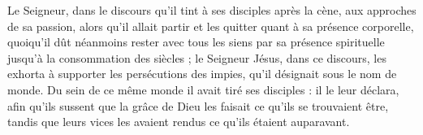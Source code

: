 Le Seigneur, dans le discours qu’il tint à ses disciples après la cène, aux approches de sa passion, alors qu’il allait partir et les quitter quant à sa présence corporelle, quoiqu’il dût néanmoins rester avec tous les siens par sa présence spirituelle jusqu’à la consommation des siècles ; le Seigneur Jésus, dans ce discours, les exhorta à supporter les persécutions des impies, qu’il désignait sous le nom de monde. Du sein de ce même monde il avait tiré ses disciples : il le leur déclara, afin qu’ils sussent que la grâce de Dieu les faisait ce qu’ils se trouvaient être, tandis que leurs vices les avaient rendus ce qu’ils étaient auparavant.